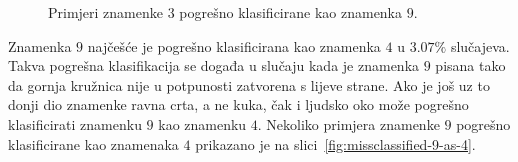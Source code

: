 \begin{figure}[htb]
    \centering
    \caption{Primjeri znamenke $3$ pogrešno klasificirane kao znamenka $9$.}
    \label{fig:missclassified-3-as-9}
\end{figure}
\newline
Znamenka $9$ najčešće je pogrešno klasificirana kao znamenka $4$ u $3.07\%$ slučajeva. Takva pogrešna klasifikacija se
događa u slučaju kada je znamenka $9$ pisana tako da gornja kružnica nije u potpunosti zatvorena s lijeve strane.
Ako je još uz to donji dio znamenke ravna crta, a ne kuka, čak i ljudsko oko može pogrešno klasificirati znamenku $9$
kao znamenku $4$. Nekoliko primjera znamenke $9$ pogrešno klasificirane kao znamenaka $4$ prikazano je na
slici\ \ref{fig:missclassified-9-as-4}.
